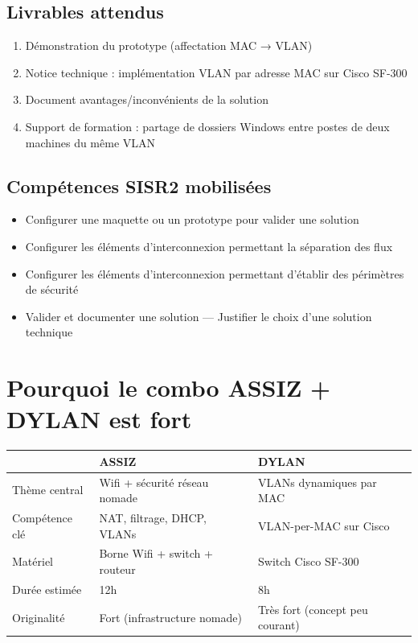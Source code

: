 \documentclass[a4paper,12pt]{article}
\begin{document}
\subsection{Livrables attendus}
\begin{enumerate}[noitemsep]
    \item Démonstration du prototype (affectation MAC → VLAN)
    \item Notice technique : implémentation VLAN par adresse MAC sur Cisco SF-300
    \item Document avantages/inconvénients de la solution
    \item Support de formation : partage de dossiers Windows entre postes de deux machines du même VLAN
\end{enumerate}

\subsection{Compétences SISR2 mobilisées}
\begin{itemize}[noitemsep]
    \item Configurer une maquette ou un prototype pour valider une solution
    \item Configurer les éléments d'interconnexion permettant la séparation des flux
    \item Configurer les éléments d'interconnexion permettant d'établir des périmètres de sécurité
    \item Valider et documenter une solution — Justifier le choix d'une solution technique
\end{itemize}

\section{Pourquoi le combo ASSIZ + DYLAN est fort}

\begin{tabularx}{\textwidth}{lXX}
    \toprule
    & \textbf{ASSIZ} & \textbf{DYLAN} \\
    \midrule
    Thème central    & Wifi + sécurité réseau nomade & VLANs dynamiques par MAC \\
    Compétence clé   & NAT, filtrage, DHCP, VLANs    & VLAN-per-MAC sur Cisco \\
    Matériel         & Borne Wifi + switch + routeur  & Switch Cisco SF-300 \\
    Durée estimée    & 12h                            & 8h \\
    Originalité      & Fort (infrastructure nomade)   & Très fort (concept peu courant) \\
    \bottomrule
\end{tabularx}
\end{document}
